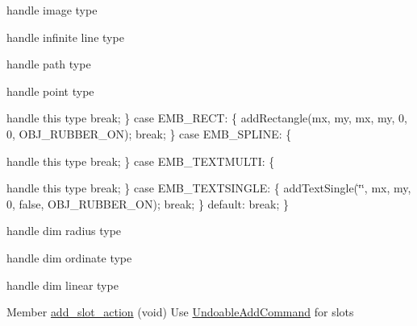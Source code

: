 \begin{DoxyRefList}
handle image type 



handle infinite line type 



handle path type 



handle point type

\label{todo__todo000136}%
%
handle this type break; \} case EMB\+\_\+\+RECT\+: \{ add\+Rectangle(mx, my, mx, my, 0, 0, OBJ\+\_\+\+RUBBER\+\_\+\+ON); break; \} case EMB\+\_\+\+SPLINE\+: \{ 

\label{todo__todo000137}%
%


\label{todo__todo000138}%
%
handle this type break; \} case EMB\+\_\+\+TEXTMULTI\+: \{ 

\label{todo__todo000139}%
%


\label{todo__todo000140}%
%
handle this type break; \} case EMB\+\_\+\+TEXTSINGLE\+: \{ add\+Text\+Single(\char`\"{}\char`\"{}, mx, my, 0, false, OBJ\+\_\+\+RUBBER\+\_\+\+ON); break; \} default\+: break; \}

\label{todo__todo000135}%
%
handle dim radius type 

\label{todo__todo000134}%
%
handle dim ordinate type

\label{todo__todo000133}%
%
handle dim linear type 
\item[Member \mbox{\hyperlink{imgui__main_8c_a565adddcd5c9478eaa23682f2d63d55c}{add\+\_\+slot\+\_\+action}} (void)]\label{todo__todo000148}%
%
Use \mbox{\hyperlink{class_undoable_add_command}{Undoable\+Add\+Command}} for slots


\end{DoxyRefList}

